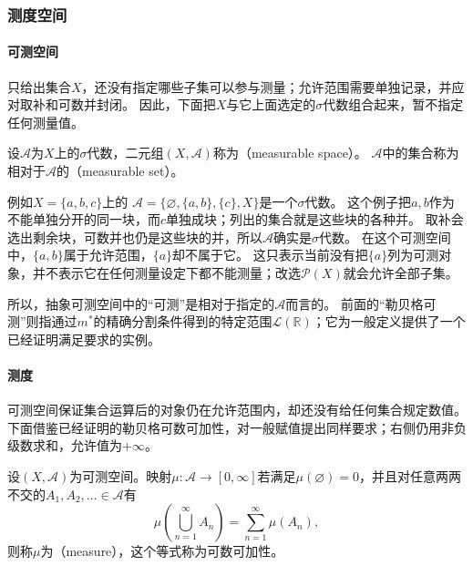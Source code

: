 \subsubsection{测度空间}

\paragraph{可测空间}

只给出集合$X$，还没有指定哪些子集可以参与测量；允许范围需要单独记录，并应对取补和可数并封闭。
因此，下面把$X$与它上面选定的$\sigma$代数组合起来，暂不指定任何测量值。

\begin{definition}[可测空间]
设$\mathcal A$为$X$上的$\sigma$代数，二元组$(X,\mathcal A)$称为（measurable space）。
$\mathcal A$中的集合称为相对于$\mathcal A$的（measurable set）。
\end{definition}
例如$X=\{a,b,c\}$上的
$\mathcal A=\{\varnothing,\{a,b\},\{c\},X\}$是一个$\sigma$代数。
这个例子把$a,b$作为不能单独分开的同一块，而$c$单独成块；列出的集合就是这些块的各种并。
取补会选出剩余块，可数并也仍是这些块的并，所以$\mathcal A$确实是$\sigma$代数。
在这个可测空间中，$\{a,b\}$属于允许范围，$\{a\}$却不属于它。
这只表示当前没有把$\{a\}$列为可测对象，并不表示它在任何测量设定下都不能测量；改选$\mathcal P(X)$就会允许全部子集。

所以，抽象可测空间中的“可测”是相对于指定的$\mathcal A$而言的。
前面的“勒贝格可测”则指通过$m^*$的精确分割条件得到的特定范围$\mathcal L(\mathbb R)$；它为一般定义提供了一个已经证明满足要求的实例。

\paragraph{测度}

可测空间保证集合运算后的对象仍在允许范围内，却还没有给任何集合规定数值。
下面借鉴已经证明的勒贝格可数可加性，对一般赋值提出同样要求；右侧仍用非负级数求和，允许值为$+\infty$。
\begin{definition}[测度]
设$(X,\mathcal A)$为可测空间。映射$\mu:\mathcal A\to[0,\infty]$若满足$\mu(\varnothing)=0$，并且对任意两两不交的$A_1,A_2,\ldots\in\mathcal A$有
\begin{equation}
 \mu\left(\bigcup_{n=1}^{\infty}A_n\right)
   =\sum_{n=1}^{\infty}\mu(A_n),
 \label{eq:comb-countable-additivity}
\end{equation}
则称$\mu$为（measure），这个等式称为可数可加性。
\end{definition}

